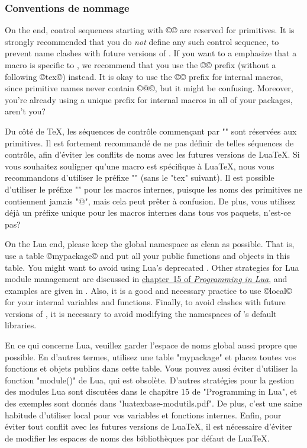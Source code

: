 \documentclass{lltxdoc}
\begin{document}
\subsubsection{Conventions de nommage}

On the \tex end, control sequences starting with ©\luatex© are reserved for
primitives. It is strongly recommended that you do \emph{not} define any such
control sequence, to prevent name clashes with future versions of \luatex. If
you want to a emphasize that a macro is specific to \luatex, we recommend that
you use the ©\lua© prefix (without a following ©tex©) instead. It is okay to
use the ©\luatex@© prefix for internal macros, since primitive names never
contain ©@©, but it might be confusing. Moreover, you're already using a
unique prefix for internal macros in all of your packages, aren't you?

Du côté de TeX, les séquences de contrôle commençant par "\luatex" sont réservées aux primitives. Il est fortement recommandé de ne pas définir de telles séquences de contrôle, afin d'éviter les conflits de noms avec les futures versions de LuaTeX. Si vous souhaitez souligner qu'une macro est spécifique à LuaTeX, nous vous recommandons d'utiliser le préfixe "\lua" (sans le "tex" suivant). Il est possible d'utiliser le préfixe "\luatex@" pour les macros internes, puisque les noms des primitives ne contiennent jamais "@", mais cela peut prêter à confusion. De plus, vous utilisez déjà un préfixe unique pour les macros internes dans tous vos paquets, n'est-ce pas?

On the Lua end, please keep the global namespace as clean as possible. That
is, use a table ©mypackage© and put all your public functions and objects in
this table. You might want to avoid using Lua's deprecated .
Other strategies for Lua module management are discussed in
\href{http://www.lua.org/pil/15.html}{chapter~15 of \emph{Programming in
Lua}}, and examples are given in . Also, it
is a good and necessary practice to use ©local© for your internal variables and
functions. Finally, to avoid clashes with future versions of \luatex, it is
necessary to avoid modifying the namespaces of \luatex's default libraries.

En ce qui concerne Lua, veuillez garder l'espace de noms global aussi propre que possible. En d'autres termes, utilisez une table "mypackage" et placez toutes vos fonctions et objets publics dans cette table. Vous pouvez aussi éviter d'utiliser la fonction "module()" de Lua, qui est obsolète. D'autres stratégies pour la gestion des modules Lua sont discutées dans le chapitre 15 de "Programming in Lua", et des exemples sont donnés dans "luatexbase-modutils.pdf". De plus, c'est une saine habitude d'utiliser local pour vos variables et fonctions internes. Enfin, pour éviter tout conflit avec les futures versions de LuaTeX, il est nécessaire d'éviter de modifier les espaces de noms des bibliothèques par défaut de LuaTeX.
\end{document}
